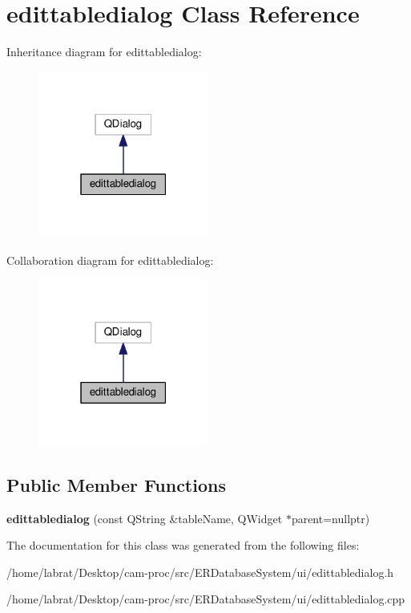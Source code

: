 \hypertarget{classedittabledialog}{}\section{edittabledialog Class Reference}
\label{classedittabledialog}


Inheritance diagram for edittabledialog\+:\nopagebreak
\begin{figure}[H]
\begin{center}
\leavevmode
\includegraphics[width=159pt]{classedittabledialog__inherit__graph}
\end{center}
\end{figure}


Collaboration diagram for edittabledialog\+:\nopagebreak
\begin{figure}[H]
\begin{center}
\leavevmode
\includegraphics[width=159pt]{classedittabledialog__coll__graph}
\end{center}
\end{figure}
\subsection*{Public Member Functions}
\begin{DoxyCompactItemize}
\item 
{\bfseries edittabledialog} (const Q\+String \&table\+Name, Q\+Widget $\ast$parent=nullptr)\hypertarget{classedittabledialog_a8d51b98098349acbb11c8d3606f7bed2}{}\label{classedittabledialog_a8d51b98098349acbb11c8d3606f7bed2}

\end{DoxyCompactItemize}


The documentation for this class was generated from the following files\+:\begin{DoxyCompactItemize}
\item 
/home/labrat/\+Desktop/cam-\/proc/src/\+E\+R\+Database\+System/ui/edittabledialog.\+h\item 
/home/labrat/\+Desktop/cam-\/proc/src/\+E\+R\+Database\+System/ui/edittabledialog.\+cpp\end{DoxyCompactItemize}
